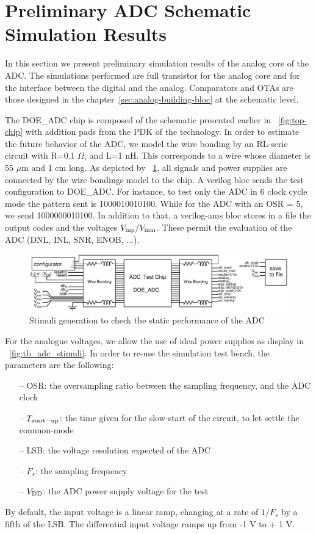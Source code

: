 \clearpage
\section{Preliminary ADC Schematic Simulation Results}
In this section we present preliminary simulation results of the analog core of the ADC\@. The simulations performed are full transistor for the analog core and for the interface between the digital and the analog. Comparators and OTAs are those designed in the chapter~\ref{sec:analog-building-bloc} at the schematic level.

The DOE\_ADC chip is composed of the schematic presented earlier in \figurename~\ref{fig:top-chip} with addition pads from the PDK of the technology. In order to estimate the future behavior of the ADC, we model the wire bonding by an RL-serie circuit with R=0.1 $\Omega$, and L=1 nH. This corresponds to a wire whose diameter is 55 $\mu$m and 1 cm long.
As depicted by \figurename~\ref{fig:tb_adc-top}, all signals and power supplies are connected by the wire bondings model to the chip. A verilog bloc sends the test configuration to DOE\_ADC\@. For instance, to test only the ADC in 6 clock cycle mode the pattern sent is 1000010010100. While for the ADC with an OSR = 5, we send 1000000010100. In addition to that, a verilog-ams bloc stores in a file the output codes and the voltages $V_{\rm inp}/V_{\rm inm}$. These permit the evaluation of the ADC (DNL, INL, SNR, ENOB, ...).

\begin{figure}[htp]
    \centering
    \includegraphics[width=\textwidth]{Chapter5/Figs/adc_chip/tb_adc_full.ps}
    \caption{Stimuli generation to check the static performance of the ADC}
    \label{fig:tb_adc-top}
\end{figure}

For the analogue voltages, we allow the use of ideal power supplies as display in \figurename~\ref{fig:tb_adc_stimuli}. In order to re-use the simulation test bench, the parameters are the following:
\begin{itemize}
    \item[--] OSR: the oversampling ratio between the sampling frequency, and the ADC clock
    \item[--] $T_{\rm start-up}$: the time given for the slow-start of the circuit, to let settle the common-mode
    \item[--] LSB: the voltage resolution expected of the ADC
    \item[--] $F_s$: the sampling frequency
    \item[--] $V_{\rm DD}$: the ADC power supply voltage for the test
\end{itemize}
By default, the input voltage is a linear ramp, changing at a rate of $1/F_s$ by a fifth of the LSB\@. The differential input voltage ramps up from -1 V to + 1 V.

